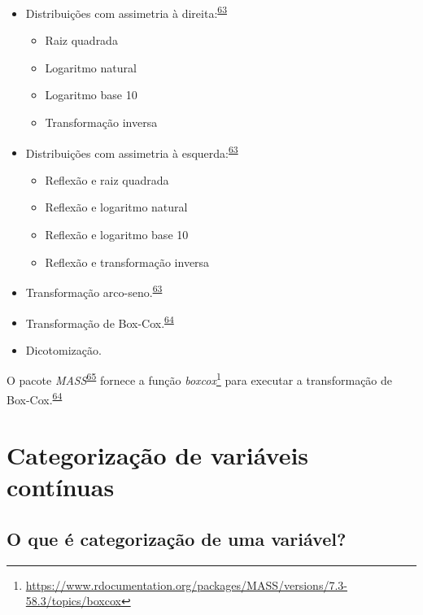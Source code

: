 \documentclass[
  a4paper,
]{book}
\renewcommand{\href}[2]{#2\footnote{\url{#1}}}
\newenvironment{infobox}[1]
  {
  \begin{itemize}
  \renewcommand{\labelitemi}{
    \raisebox{-.7\height}[0pt][0pt]{
      {\setkeys{Gin}{width=3em,keepaspectratio}
        \texttt{[image: \#1]}}
    }
  }
  \setlength{\fboxsep}{1em}
  \begin{blackbox}
  \item
  }
  {
  \end{blackbox}
  \end{itemize}
  }
\begin{document}
\begin{itemize}
\item
  Distribuições com assimetria à direita:\textsuperscript{\protect\hyperlink{ref-osborne2010}{63}}

  \begin{itemize}
  \item
    Raiz quadrada
  \item
    Logaritmo natural
  \item
    Logaritmo base 10
  \item
    Transformação inversa
  \end{itemize}
\item
  Distribuições com assimetria à esquerda:\textsuperscript{\protect\hyperlink{ref-osborne2010}{63}}

  \begin{itemize}
  \item
    Reflexão e raiz quadrada
  \item
    Reflexão e logaritmo natural
  \item
    Reflexão e logaritmo base 10
  \item
    Reflexão e transformação inversa
  \end{itemize}
\item
  Transformação arco-seno.\textsuperscript{\protect\hyperlink{ref-osborne2010}{63}}
\item
  Transformação de Box-Cox.\textsuperscript{\protect\hyperlink{ref-box1964}{64}}
\item
  Dicotomização.
\end{itemize}

\begin{infobox}{images/Rlogo}
O pacote \emph{MASS}\textsuperscript{\protect\hyperlink{ref-MASS}{65}} fornece a função \href{https://www.rdocumentation.org/packages/MASS/versions/7.3-58.3/topics/boxcox}{\emph{boxcox}} para executar a transformação de Box-Cox.\textsuperscript{\protect\hyperlink{ref-box1964}{64}}

\end{infobox}

\hypertarget{categorizacao}{%
\section{Categorização de variáveis contínuas}\label{categorizacao}}

\hypertarget{o-que-uxe9-categorizauxe7uxe3o-de-uma-variuxe1vel}{%
\subsection{O que é categorização de uma variável?}\label{o-que-uxe9-categorizauxe7uxe3o-de-uma-variuxe1vel}}
\end{document}
